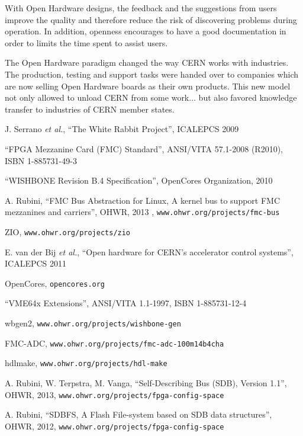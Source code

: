 \documentclass{JAC2003}
\begin{document}
With Open Hardware designs, the feedback and the suggestions from users improve the quality and therefore reduce the risk of discovering problems during operation.
In addition, openness encourages to have a good documentation in order to limits the time spent to assist users.

The Open Hardware paradigm changed the way CERN works with industries. The production, testing and support tasks were handed over to companies which are now selling Open Hardware boards as their own products.
This new model not only allowed to unload CERN from some work... but also favored knowledge transfer to industries of CERN member states.





\begin{thebibliography}{99} %

J. Serrano \textit{et al.}, ``The White Rabbit Project'', ICALEPCS 2009

``FPGA Mezzanine Card (FMC) Standard'', ANSI/VITA 57.1-2008 (R2010), ISBN 1-885731-49-3

``WISHBONE Revision B.4 Specification'', OpenCores Organization, 2010

A. Rubini, ``FMC Bus Abstraction for Linux, A kernel bus to support FMC mezzanines and carriers'', OHWR, 2013 , \texttt{www.ohwr.org/projects/fmc-bus}

ZIO, \texttt{www.ohwr.org/projects/zio}

E. van der Bij \textit{et al.}, ``Open hardware for CERN's accelerator control systems'', ICALEPCS 2011

OpenCores, \texttt{opencores.org}

``VME64x Extensions'', ANSI/VITA 1.1-1997, ISBN 1-885731-12-4

wbgen2, \texttt{www.ohwr.org/projects/wishbone-gen}

FMC-ADC, \texttt{www.ohwr.org/projects/fmc-adc-100m14b4cha}

hdlmake, \texttt{www.ohwr.org/projects/hdl-make}

A. Rubini, W. Terpstra, M. Vanga, ``Self-Describing Bus (SDB), Version 1.1'', OHWR, 2013, \texttt{www.ohwr.org/projects/fpga-config-space}

A. Rubini, ``SDBFS, A Flash File-system based on SDB data structures'', OHWR, 2012, \texttt{www.ohwr.org/projects/fpga-config-space}

\end{thebibliography}
\end{document}
